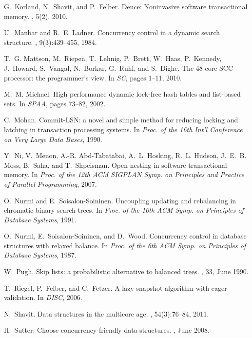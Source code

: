 \begin{thebibliography}{99}
{
G.~Korland, N.~Shavit, and P.~Felber.
\newblock Deuce: Noninvasive software transactional memory.
, 5(2), 2010.

U.~Manbar and R.~E. Ladner.
\newblock Concurrency control in a dynamic search structure.
, 9(3):439--455, 1984.

T.~G. Mattson, M.~Riepen, T.~Lehnig, P.~Brett, W.~Haas, P.~Kennedy, J.~Howard,
  S.~Vangal, N.~Borkar, G.~Ruhl, and S.~Dighe.
\newblock The 48-core {SCC} processor: the programmer's view.
\newblock In {\em SC}, pages 1--11, 2010.

M.~M. Michael.
\newblock High performance dynamic lock-free hash tables and list-based sets.
\newblock In {\em SPAA}, pages 73--82, 2002.

C.~Mohan.
\newblock Commit-{LSN}: a novel and simple method for reducing locking and
  latching in transaction processing systems.
\newblock In {\em Proc. of the 16th Int'l Conference on Very Large Data Bases},
  1990.

Y.~Ni, V.~Menon, A.-R. Abd-Tabatabai, A.~L. Hosking, R.~L. Hudson, J.~E.~B.
  Moss, B.~Saha, and T.~Shpeisman.
\newblock Open nesting in software transactional memory.
\newblock In {\em Proc. of the 12th ACM SIGPLAN Symp. on Principles and
  Practice of Parallel Programming}, 2007.

O.~Nurmi and E.~Soisalon-Soininen.
\newblock Uncoupling updating and rebalancing in chromatic binary search trees.
\newblock In {\em Proc. of the 10th ACM Symp. on Principles of Database
  Systems}, 1991.

O.~Nurmi, E.~Soisalon-Soininen, and D.~Wood.
\newblock Concurrency control in database structures with relaxed balance.
\newblock In {\em Proc. of the 6th ACM Symp. on Principles of Database
  Systems}, 1987.

W.~Pugh.
\newblock Skip lists: a probabilistic alternative to balanced trees.
, 33, June 1990.

T.~Riegel, P.~Felber, and C.~Fetzer.
\newblock A lazy snapshot algorithm with eager validation.
\newblock In {\em DISC}, 2006.

N.~Shavit.
\newblock Data structures in the multicore age.
, 54(3):76--84, 2011.

H.~Sutter.
\newblock Choose concurrency-friendly data structures.
, June 2008.

}
\end{thebibliography}
